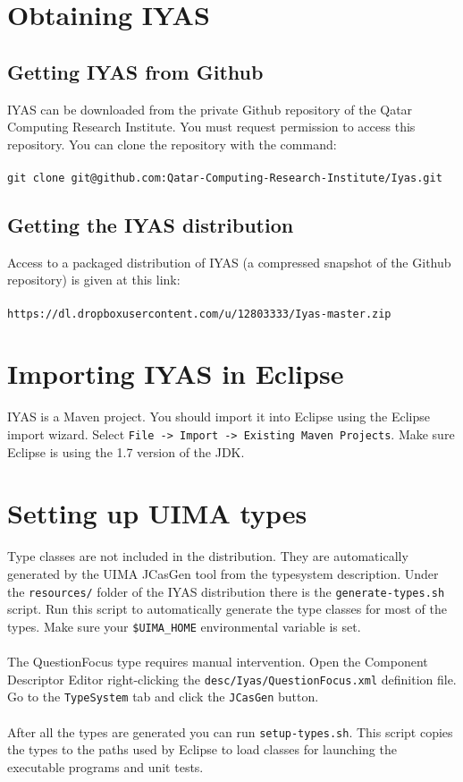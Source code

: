 \documentclass{wileysev}
\begin{document}
\section[Obtaining IYAS]{Obtaining IYAS}

\subsection[Getting IYAS from Github]{Getting IYAS from Github}

IYAS can be downloaded from the private Github repository of the Qatar Computing Research Institute. You must request permission to access this repository. You can clone the repository with the command:\\\\
\texttt{\small git clone git@github.com:Qatar-Computing-Research-Institute/Iyas.git}

\subsection[Getting the IYAS distribution]{Getting the IYAS distribution}
Access to a packaged distribution of IYAS (a compressed snapshot of the Github repository) is given at this link:
\\\\
\texttt{https://dl.dropboxusercontent.com/u/12803333/Iyas-master.zip}

\section[Importing IYAS in Eclipse]{Importing IYAS in Eclipse}
IYAS is a Maven project. You should import it into Eclipse using the Eclipse import wizard. Select \texttt{File -> Import -> Existing Maven Projects}. Make sure Eclipse is using the 1.7 version of the JDK.

\section[Setting up UIMA types]{Setting up UIMA types}
Type classes are not included in the distribution. They are automatically generated by the UIMA JCasGen tool from the typesystem description. Under the \texttt{resources/} folder of the IYAS distribution there is the \texttt{generate-types.sh} script. Run this script to automatically generate the type classes for most of the types. Make sure your \texttt{\$UIMA\_HOME} environmental variable is set.
\\\\
The QuestionFocus type requires manual intervention. Open the Component Descriptor Editor right-clicking the \texttt{desc/Iyas/QuestionFocus.xml} definition file. Go to the \texttt{TypeSystem} tab and click the \texttt{JCasGen} button.
\\\\
After all the types are generated you can run \texttt{setup-types.sh}. This script copies the types to the paths used by Eclipse to load classes for launching the executable programs and unit tests. 
\end{document}
